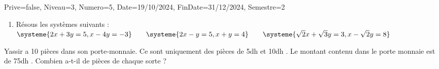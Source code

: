 \documentclass[a4paper,12pt]{article}
\begin{document}
\begin{Maquette}[DM]{Prive=false, Niveau=3, Numero=5, Date=19/10/2024, FinDate=31/12/2024, Semestre=2}
\begin{exercice}
\begin{enumerate}
\item Résous les systèmes suivants :
\(
\systeme{2x+3y=5,x-4y=-3}      
\qquad
\systeme{2x-y=5,x+y=4}
\qquad
\systeme{\sqrt{2}x+\sqrt{3}y=3,x-\sqrt{2}y=8}
\)
\end{enumerate}
\end{exercice}
\begin{exercice}
Yassir a 10 pièces dans son porte-monnaie. Ce sont uniquement des pièces de 5dh et 10dh . Le montant contenu dans le porte monnaie est de 75dh . Combien a-t-il de pièces de chaque sorte ?
\end{exercice}
%

\end{Maquette}
\end{document}
